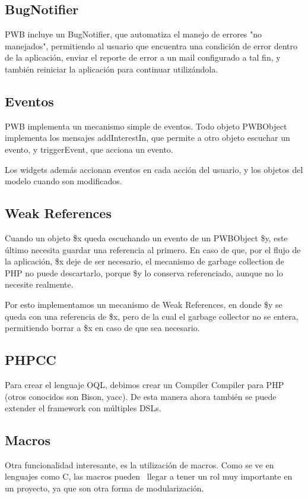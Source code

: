 \subsection{BugNotifier}

PWB incluye un BugNotifier, que automatiza el manejo de errores "no manejados", permitiendo al usuario que
encuentra una condición de error dentro de la aplicación, enviar el reporte de error a un mail configurado a
tal fin, y también reiniciar la aplicación para continuar utilizándola.

\subsection{Eventos}
\label{sub-events}
PWB implementa un mecanismo simple de eventos. Todo objeto PWBObject implementa los mensajes addInterestIn, que permite a otro objeto escuchar un evento,
y triggerEvent, que acciona un evento.

Los widgets además accionan eventos en cada acción del usuario, y los objetos del modelo cuando son modificados.


\subsection{Weak References}
\label{sub-weak}
Cuando un objeto \$x queda escuchando un evento de un PWBObject \$y, este último necesita guardar una referencia al primero. En caso de que, por el flujo de la
aplicación, \$x deje de ser necesario, el mecanismo de garbage collection de PHP no puede descartarlo, porque \$y lo conserva referenciado, aunque no lo
necesite realmente.

Por esto implementamos un mecanismo de Weak References, en donde \$y se queda con una referencia de \$x, pero de la cual el garbage collector no se entera,
permitiendo borrar a \$x en caso de que sea necesario.


\subsection{PHPCC}
\label{sub-phpcc}
Para crear el lenguaje OQL, debimos crear un Compiler Compiler para PHP (otros conocidos son Bison, yacc).
De esta manera ahora también se puede extender el framework con múltiples DSLs.

\subsection{Macros}
\label{sub-macros}
Otra funcionalidad interesante, es la utilización de macros. Como se ve en lenguajes como C, las macros pueden \
llegar a tener un rol muy importante en un proyecto, ya que son otra forma de modularización.

